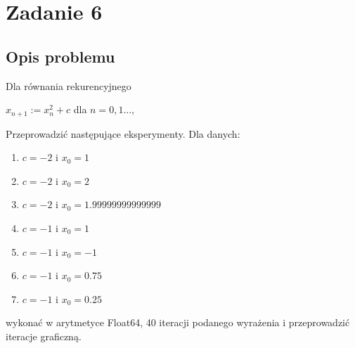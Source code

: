 \documentclass{article}
\begin{document}
\section*{Zadanie 6}
\subsection*{Opis problemu}
	Dla równania rekurencyjnego \\
	\centerline{$x_{n+1} := x_n^2 + c$ dla $n = 0, 1...,$ \\}
	Przeprowadzić następujące eksperymenty. Dla danych:
	\begin{enumerate}
        \item $c = -2$ i $x_0 = 1$
        \item $c = -2$ i $x_0 = 2$
        \item $c = -2$ i $x_0 = 1.99999999999999$
        \item $c = -1$ i $x_0 = 1$
        \item $c = -1$ i $x_0 = -1$
        \item $c = -1$ i $x_0 = 0.75$
        \item $c = -1$ i $x_0 = 0.25$
    \end{enumerate}
    wykonać w arytmetyce Float64, 40 iteracji podanego wyrażenia i przeprowadzić iteracje graficzną.
\end{document}

